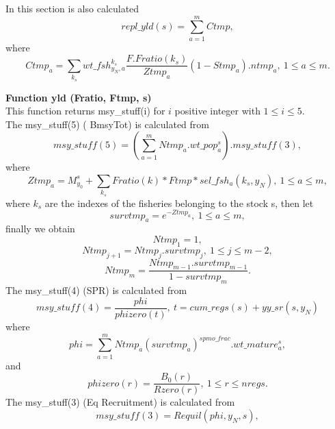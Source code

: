 \documentclass{article}
\begin{document}
In this section is also calculated
\begin{equation}
    repl\_yld(s)=\sum_{a=1}^m Ctmp,
\end{equation}
where
\begin{equation}
    Ctmp_a=\sum_{k_s} wt\_fsh^{k_s}_{y_N,a}\dfrac{F.Fratio(k_s)}{Ztmp_a}(1-Stmp_a).ntmp_a, \ 1\leq a \leq m.
\end{equation}

\textbf{Function yld (Fratio, Ftmp, s)}\\

This function returns msy\_stuff(i) for $i$ positive integer with $1\leq i \leq 5$. \\
The msy\_stuff(5) ( BmsyTot) is calculated from
\begin{equation}
    msy\_stuff(5)=\left(\sum_{a=1}^m Ntmp_a.wt\_pop^s_a\right).msy\_stuff(3),
\end{equation}
where
\begin{equation}
    Ztmp_a=M^s_{y_0}+\sum_{k_s}Fratio(k)*Ftmp*sel\_fsh_a(k_s,y_N), \ 1\leq a \leq m, 
\end{equation}
where $k_s$ are the indexes of the fisheries belonging to the stock s, then let
\begin{equation}
    survtmp_a=e^{-Ztmp_a}, \ 1\leq a \leq m,
\end{equation}
finally we obtain
\begin{equation}
    Ntmp_1=1,
\end{equation}
\begin{equation}
    Ntmp_{j+1}=Ntmp_j.survtmp_j, \ 1\leq j \leq m-2,
\end{equation}
\begin{equation}
    Ntmp_m=\dfrac{Ntmp_{m-1}.survtmp_{m-1}}{1-survtmp_m}.
\end{equation}
The msy\_stuff(4) (SPR) is calculated from
\begin{equation}
    msy\_stuff(4)=\dfrac{phi}{phizero(t)}, \ t=cum\_regs(s)+yy\_sr(s,y_N)
\end{equation}
where 
\begin{equation}
    phi= \sum_{a=1}^m Ntmp_a(survtmp_a)^{spmo\_frac}.wt\_mature^s_a,
\end{equation}
and 
\begin{equation}
    phizero(r)=\dfrac{B_0(r)}{Rzero(r)}, \ 1\leq r \leq nregs.
\end{equation}
The msy\_stuff(3) (Eq Recruitment) is calculated from
\begin{equation}
    msy\_stuff(3)  = Requil(phi,y_N,s),
\end{equation}
\end{document}
